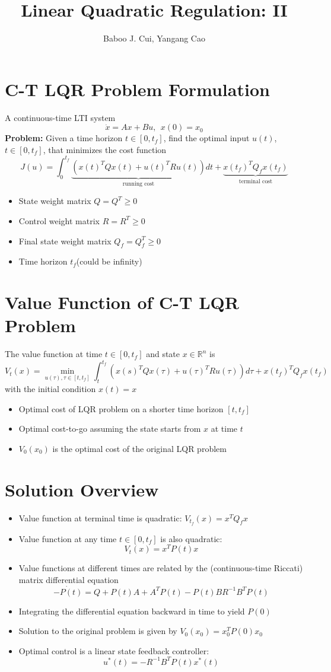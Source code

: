 \documentclass[10pt,a4paper,oneside]{article}
\author{Baboo J. Cui, Yangang Cao}
\title{Linear Quadratic Regulation: II}
\begin{document}
\maketitle
\tableofcontents

\newpage
\section{C-T LQR Problem Formulation}
A continuous-time LTI system
\[
\dot{x} = Ax+Bu,\ \ x(0)=x_0
\]
{\bfseries Problem: }Given a time horizon $t\in [ 0,t_f]$, find the optimal input $u(t)$, $t\in[0,t_f]$, that minimizes the cost function
$$
J(u)=\int_{0}^{t_{f}} \underbrace{\left(x(t)^{T} Q x(t)+u(t)^{T} R u(t)\right)}_{\text { running cost }} d t+\underbrace{x\left(t_{f}\right)^{T} Q_{f} x\left(t_{f}\right)}_{\text { terminal cost }}
$$
\begin{itemize}
\item State weight matrix $Q=Q^T\geqslant0$
\item Control weight matrix $R=R^T\geqslant0$
\item Final state weight matrix $Q_f=Q^T_f\geqslant0$ 
\item Time horizon $t_f$(could be infinity)
\end{itemize}
\section{Value Function of C-T LQR Problem}
The value function at time $t\in[0,t_f]$ and state $x\in \mathbb{R}^n$ is
$$
V_{t}(x)=\min _{u(\tau), \tau \in\left[t, t_{f}\right]} \int_{t}^{t_{f}}\left(x(s)^{T} Q x(\tau)+u(\tau)^{T} R u(\tau)\right) d \tau+x\left(t_{f}\right)^{T} Q_{f} x\left(t_{f}\right)
$$
with the initial condition $x(t)=x$
\begin{itemize}
\item Optimal cost of LQR problem on a shorter time horizon $[t,t_f]$
\item Optimal cost-to-go assuming the state starts from $x$ at time $t$
\item $V_0(x_0)$ is the optimal cost of the original LQR problem
\end{itemize}
\section{Solution Overview}
\begin{itemize}
\item Value function at terminal time is quadratic: $V_{t_f}(x)=x^TQ_fx$
\item Value function at any time $t\in[0,t_f]$ is also quadratic:
\[
V_t(x)=x^TP(t)x
\]
\item Value functions at different times are related by the (continuous-time Riccati) matrix differential equation
\[
\dot{-P(t)}=Q+P(t)A + A^TP(t)-P(t)BR^{-1}B^TP(t)
\]
\item Integrating the differential equation backward in time to yield $P(0)$
\item Solution to the original problem is given by $V_0(x_0)=x^T_0P(0)x_0$
\item Optimal control is a linear state feedback controller:
$$
u^{*}(t)=-R^{-1} B^{T} P(t) x^{*}(t)
$$
\end{itemize}
\end{document}
